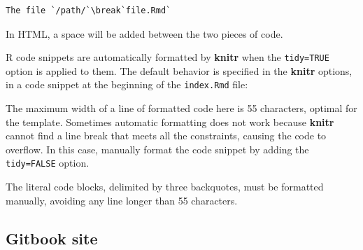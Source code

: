 \documentclass[
  12pt,
  american,
  a4paper,
  extrafontsizes,onecolumn,openright
  ]{memoir}
\newenvironment{Shaded}{\begin{snugshade}}{\end{snugshade}}
\newcommand{\AttributeTok}[1]{\textcolor[rgb]{0.13,0.29,0.53}{#1}}
\newcommand{\CommentTok}[1]{\textcolor[rgb]{0.56,0.35,0.01}{\textit{#1}}}
\newcommand{\ConstantTok}[1]{\textcolor[rgb]{0.56,0.35,0.01}{#1}}
\newcommand{\DecValTok}[1]{\textcolor[rgb]{0.00,0.00,0.81}{#1}}
\newcommand{\FunctionTok}[1]{\textcolor[rgb]{0.13,0.29,0.53}{\textbf{#1}}}
\newcommand{\NormalTok}[1]{#1}
\newcommand{\SpecialCharTok}[1]{\textcolor[rgb]{0.81,0.36,0.00}{\textbf{#1}}}
\newcommand{\StringTok}[1]{\textcolor[rgb]{0.31,0.60,0.02}{#1}}
\newlength{\rf}
\begin{document}
\begin{verbatim}
The file `/path/`\break`file.Rmd`
\end{verbatim}

In HTML, a space will be added between the two pieces of code.

R code snippets are automatically formatted by \textbf{knitr} when the \texttt{tidy=TRUE} option is applied to them.
The default behavior is specified in the \textbf{knitr} options, in a code snippet at the beginning of the \texttt{index.Rmd} file:

\scriptsize

\begin{Shaded}
\end{Shaded}

\normalsize

The maximum width of a line of formatted code here is 55 characters, optimal for the template.
Sometimes automatic formatting does not work because \textbf{knitr} cannot find a line break that meets all the constraints, causing the code to overflow.
In this case, manually format the code snippet by adding the \texttt{tidy=FALSE} option.

The literal code blocks, delimited by three backquotes, must be formatted manually, avoiding any line longer than 55 characters.

\subsection{Gitbook site}\label{gitbook-site}
\end{document}
